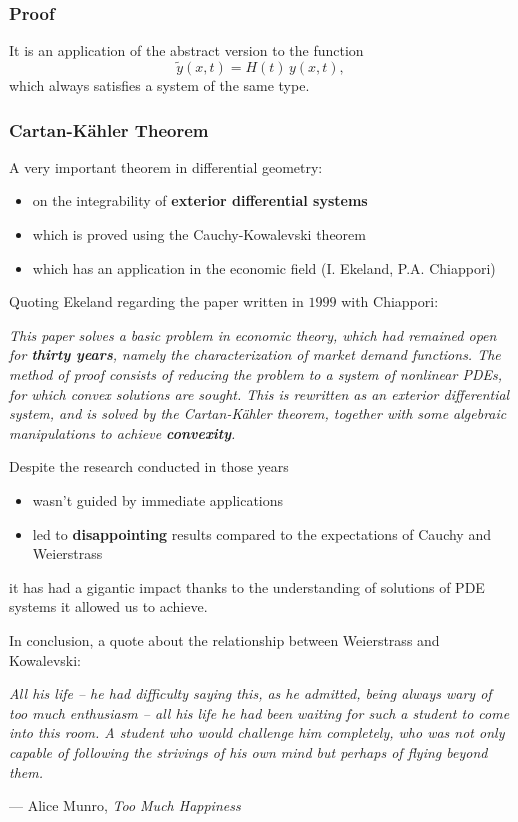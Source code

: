 \documentclass[serif,notheorems]{beamer}
\theoremstyle{definition} %
\theoremstyle{remark}
\begin{document}
\begin{frame}
\frametitle{Proof}
It is an application of the abstract version to the function $$\widetilde{y}(x,t) = H(t) \, y(x,t),$$ 
which always satisfies a system of the same type.
\end{frame}

\begin{frame}
\frametitle{Cartan-Kähler Theorem}
A very important theorem in differential geometry:
\begin{itemize}
\item on the integrability of \textbf{exterior differential systems}
\item which is proved using the Cauchy-Kowalevski theorem
\item which has an application in the economic field (I. Ekeland, P.A. Chiappori)
\end{itemize}
\end{frame}

\begin{frame}
Quoting Ekeland regarding the paper written in $1999$ with Chiappori:\\
\begin{center}
\textit{This paper solves a basic problem in economic theory, which had remained open for \textbf{thirty years}, namely the characterization of market demand functions. The method of proof consists of reducing the problem to a system of nonlinear PDEs, for which convex solutions are sought. This is rewritten as an exterior differential system, and is solved by the Cartan-Kähler theorem, together with some algebraic manipulations to achieve \textbf{convexity}.}
\end{center}
\end{frame}

\begin{frame}
Despite the research conducted in those years
\begin{itemize}
\item wasn't guided by immediate applications
\item led to \textbf{disappointing} results compared to the expectations of Cauchy and Weierstrass
\end{itemize}
it has had a gigantic impact thanks to the understanding of solutions of PDE systems it allowed us to achieve.
\end{frame}

\begin{frame}
In conclusion, a quote about the relationship between Weierstrass and Kowalevski:\\
\begin{center}
\textit{All his life -- he had difficulty saying this, as he admitted, being always wary of too much enthusiasm -- all his life he had been waiting for such a student to come into this room. A student who would challenge him completely, who was not only capable of following the strivings of his own mind but perhaps of flying beyond them.}
\end{center}
\null\hfill --- Alice Munro, \textit{Too Much Happiness}
\end{frame}
\end{document}
